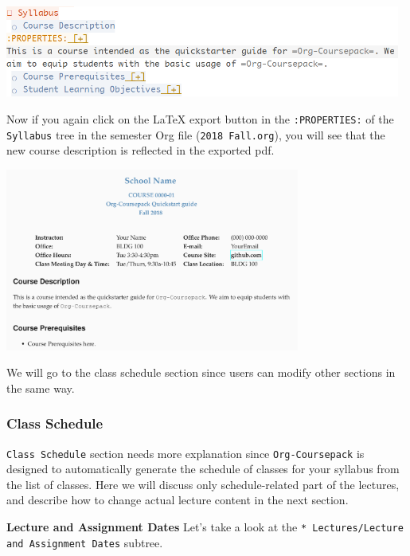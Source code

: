 \documentclass[10pt,article]{article}
\begin{document}
\begin{center}
\includegraphics[height=3cm]{../../../Assets/Images/Org-Teaching/Quickstart_Syllabus-Course-Description-Content-Edited.png}
\end{center}

Now if you again click on the \LaTeX{} export button in the \texttt{:PROPERTIES:} of the \texttt{Syllabus} 
tree in the semester Org file (\texttt{2018 Fall.org}), you will see that the new course description 
is reflected in the exported pdf.

\begin{center}
\includegraphics[height=6cm]{../../../Assets/Images/Org-Teaching/Quickstart_Syllabus-Exported-Course-Desc.png}
\end{center}

We will go to the class schedule section since users can modify other sections in the same way. 

\subsubsection{Class Schedule}
\label{sec:orgcdb4032}
\texttt{Class Schedule} section needs more explanation since \texttt{Org-Coursepack} is
designed to automatically generate the schedule of classes for your syllabus
from the list of classes. Here we will discuss only schedule-related part of
the lectures, and describe how to change actual lecture content in the next
section.

\textbf{Lecture and Assignment Dates}
Let's take a look at the \texttt{* Lectures/Lecture and Assignment Dates} subtree.
\end{document}
